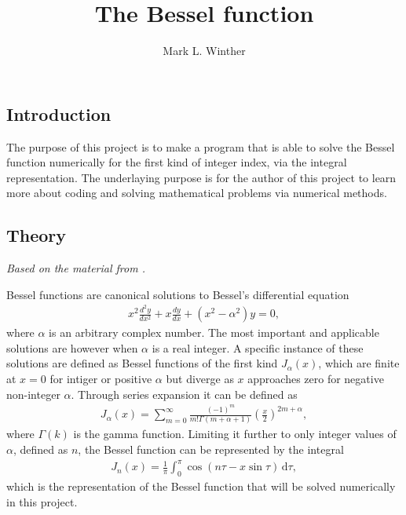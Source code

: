\documentclass[twocolumn]{article}
\author{Mark L. Winther}
\title{The Bessel function}
\newcommand\dx[1]{\,\text{d}#1}
\begin{document}
\maketitle

\subsection*{Introduction}
The purpose of this project is to make a program that is able to solve the Bessel function numerically for the first kind of integer index, via the integral representation. The underlaying purpose is for the author of this project to learn more about coding and solving mathematical problems via numerical methods.

\subsection*{Theory}
\emph{Based on the material from \cite{wiki}.}

Bessel functions are canonical solutions to Bessel's differential equation
\begin{align}
	x^2\frac{d^2y}{dx^2}+x\frac{dy}{dx}+\left(x^2-\alpha^2\right)y=0,
\end{align}
where $\alpha$ is an arbitrary complex number. The most important and applicable solutions are however when $\alpha$ is a real integer. A specific instance of these solutions are defined as Bessel functions of the first kind $J_\alpha(x)$, which are finite at $x=0$ for intiger or positive $\alpha$ but diverge as $x$ approaches zero for negative non-integer $\alpha$. Through series expansion it can be defined as
\begin{align}
	J_\alpha(x) = \sum_{m=0}^\infty \frac{\left(-1\right)^m}{m!\Gamma\left(m+\alpha+1\right)}\left(\frac{x}{2}\right)^{2m+\alpha},
\end{align}
where $\Gamma(k)$ is the gamma function. Limiting it further to only integer values of $\alpha$, defined as $n$, the Bessel function can be represented by the integral
\begin{align}
	J_n(x) = \frac{1}{\pi} \int_0^\pi \cos\left(n\tau-x\sin\tau\right)\dx{\tau},
	\label{eq:Bessel}
\end{align}
which is the representation of the Bessel function that will be solved numerically in this project.
\end{document}
